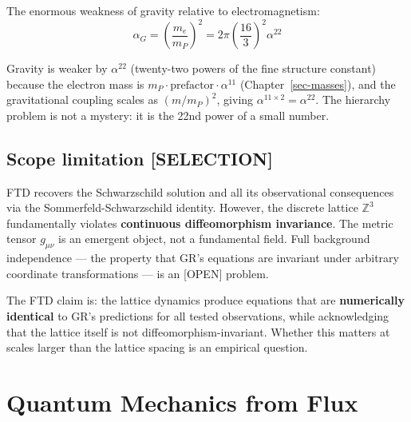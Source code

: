\documentclass[
  11pt,
  letterpaper,
  twoside,
  openany]{book}
\makeatletter
\let\orig@section\section
\renewcommand{\section}{\needspace{8\baselineskip}\orig@section}
\makeatother
\begin{document}
The enormous weakness of gravity relative to electromagnetism: \[
\alpha_G = \left(\frac{m_e}{m_P}\right)^2 = 2\pi \left(\frac{16}{3}\right)^2 \alpha^{22}
\tag{15.5}
\]

Gravity is weaker by \(\alpha^{22}\) (twenty-two powers of the fine
structure constant) because the electron mass is
\(m_P \cdot \text{prefactor} \cdot \alpha^{11}\)
(Chapter~\ref{sec-masses}), and the gravitational coupling scales as
\((m/m_P)^2\), giving \(\alpha^{11 \times 2} = \alpha^{22}\). The
hierarchy problem is not a mystery: it is the 22nd power of a small
number.

\section{Scope limitation
{[}SELECTION{]}}\label{scope-limitation-selection}

\begin{tcolorbox}[enhanced jigsaw, colbacktitle=quarto-callout-warning-color!10!white, titlerule=0mm, bottomtitle=1mm, bottomrule=.15mm, colback=white, arc=.35mm, breakable, toprule=.15mm, title=\textcolor{quarto-callout-warning-color}{\faExclamationTriangle}\hspace{0.5em}{Honest limitation}, rightrule=.15mm, coltitle=black, leftrule=.75mm, colframe=quarto-callout-warning-color-frame, toptitle=1mm, opacityback=0, opacitybacktitle=0.6, left=2mm]

FTD recovers the Schwarzschild solution and all its observational
consequences via the Sommerfeld-Schwarzschild identity. However, the
discrete lattice \(\mathbb{Z}^3\) fundamentally violates
\textbf{continuous diffeomorphism invariance}. The metric tensor
\(g_{\mu\nu}\) is an emergent object, not a fundamental field. Full
background independence --- the property that GR's equations are
invariant under arbitrary coordinate transformations --- is an
{[}OPEN{]} problem.

The FTD claim is: the lattice dynamics produce equations that are
\textbf{numerically identical} to GR's predictions for all tested
observations, while acknowledging that the lattice itself is not
diffeomorphism-invariant. Whether this matters at scales larger than the
lattice spacing is an empirical question.

\end{tcolorbox}

\chapter{Quantum Mechanics from Flux}\label{sec-qm}
\end{document}

